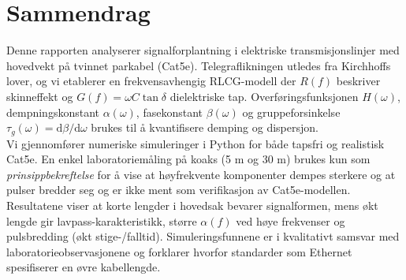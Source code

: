\section*{Sammendrag}
Denne rapporten analyserer signalforplantning i elektriske transmisjonslinjer med hovedvekt på tvinnet parkabel (Cat5e). Telegraflikningen utledes fra Kirchhoffs lover, og vi etablerer en frekvensavhengig RLCG-modell der \(R(f)\) beskriver skinneffekt og \(G(f)=\omega C\tan\delta\) dielektriske tap. Overføringsfunksjonen \(H(\omega)\), dempningskonstant \(\alpha(\omega)\), fasekonstant \(\beta(\omega)\) og gruppeforsinkelse \(\tau_g(\omega)=\mathrm{d}\beta/\mathrm{d}\omega\) brukes til å kvantifisere demping og dispersjon.\\[1em]
Vi gjennomfører numeriske simuleringer i Python for både tapsfri og realistisk Cat5e. En enkel laboratoriemåling på koaks (5 m og 30 m) brukes kun som \emph{prinsippbekreftelse} for å vise at høyfrekvente komponenter dempes sterkere og at pulser bredder seg og er ikke ment som verifikasjon av Cat5e-modellen.\\[1em]
Resultatene viser at korte lengder i hovedsak bevarer signalformen, mens økt lengde gir lavpass-karakteristikk, større \(\alpha(f)\) ved høye frekvenser og pulsbredding (økt stige-/falltid). Simuleringsfunnene er i kvalitativt samsvar med laboratorieobservasjonene og forklarer hvorfor standarder som Ethernet spesifiserer en øvre kabellengde.
